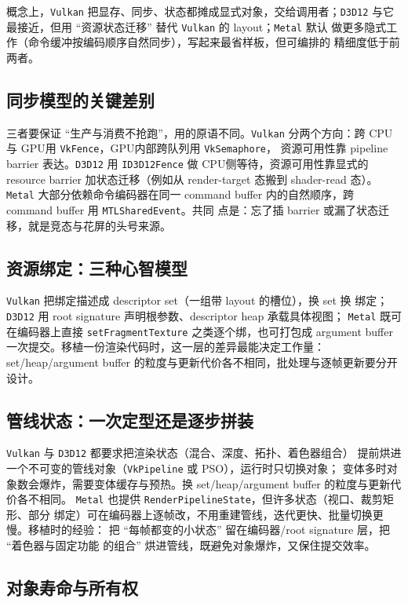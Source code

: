\documentclass[12pt,a4paper,fontset=fandol]{ctexbook}
\newcommand{\Tp}[1]{\texttt{#1}}
\newcommand{\Lang}[1]{\textsf{#1}}
\newcommand{\DomCPU}{\Lang{CPU}}
\newcommand{\DomGPU}{\Lang{GPU}}
\begin{document}
概念上，\Tp{Vulkan} 把显存、同步、状态都摊成显式对象，交给调用者；\Tp{D3D12}
与它最接近，但用 ``资源状态迁移'' 替代 \Tp{Vulkan} 的 layout；\Tp{Metal} 默认
做更多隐式工作（命令缓冲按编码顺序自然同步），写起来最省样板，但可编排的
精细度低于前两者。

\subsection{同步模型的关键差别}

三者要保证 ``生产与消费不抢跑''，用的原语不同。\Tp{Vulkan} 分两个方向：跨
\DomCPU 与 \DomGPU 用 \Tp{VkFence}，\DomGPU 内部跨队列用 \Tp{VkSemaphore}，
资源可用性靠 pipeline barrier 表达。\Tp{D3D12} 用 \Tp{ID3D12Fence} 做
\DomCPU 侧等待，资源可用性靠显式的 resource barrier 加状态迁移（例如从
render-target 态搬到 shader-read 态）。\Tp{Metal} 大部分依赖命令编码器在同一
command buffer 内的自然顺序，跨 command buffer 用 \Tp{MTLSharedEvent}。共同
点是：忘了插 barrier 或漏了状态迁移，就是竞态与花屏的头号来源。

\subsection{资源绑定：三种心智模型}

\Tp{Vulkan} 把绑定描述成 descriptor set（一组带 layout 的槽位），换 set 换
绑定；\Tp{D3D12} 用 root signature 声明根参数、descriptor heap 承载具体视图；
\Tp{Metal} 既可在编码器上直接 \Tp{setFragmentTexture} 之类逐个绑，也可打包成
argument buffer 一次提交。移植一份渲染代码时，这一层的差异最能决定工作量：
set/heap/argument buffer 的粒度与更新代价各不相同，批处理与逐帧更新要分开设计。

\subsection{管线状态：一次定型还是逐步拼装}

\Tp{Vulkan} 与 \Tp{D3D12} 都要求把渲染状态（混合、深度、拓扑、着色器组合）
提前烘进一个不可变的管线对象（\Tp{VkPipeline} 或 PSO），运行时只切换对象；
变体多时对象数会爆炸，需要变体缓存与预热。换 set/heap/argument buffer 的粒度与更新代价各不相同。
\Tp{Metal} 也提供 \Tp{RenderPipelineState}，但许多状态（视口、裁剪矩形、部分
绑定）可在编码器上逐帧改，不用重建管线，迭代更快、批量切换更慢。移植时的经验：
把 ``每帧都变的小状态'' 留在编码器/root signature 层，把 ``着色器与固定功能
的组合'' 烘进管线，既避免对象爆炸，又保住提交效率。

\subsection{对象寿命与所有权}
\end{document}
